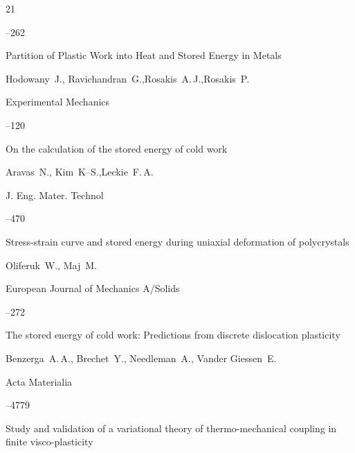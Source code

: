 \begin{thebibliography}{21}


--262




\paper Partition of Plastic Work into Heat and Stored Energy in Metals

\by  Hodowany~J., Ravichandran~G.,Rosakis~A.\,J.,Rosakis~P.

\jour Experimental Mechanics



--120




\paper On the calculation of the stored energy of cold work

\by  Aravas~N., Kim~K--S.,Leckie~F.\,A.

\jour J. Eng. Mater. Technol



--470




\paper Stress-strain curve and stored energy during uniaxial deformation of  polycrystals

\by  Oliferuk~W., Maj~M.

\jour European Journal of Mechanics A/Solids



--272




\paper The stored energy of cold work: Predictions from discrete dislocation plasticity

\by  Benzerga~A.\,A., Brechet~Y., Needleman~A., Vander Giessen~E.

\jour Acta Materialia



--4779




\paper Study and validation of a variational theory of thermo-mechanical coupling in finite visco-plasticity


\end{thebibliography}
